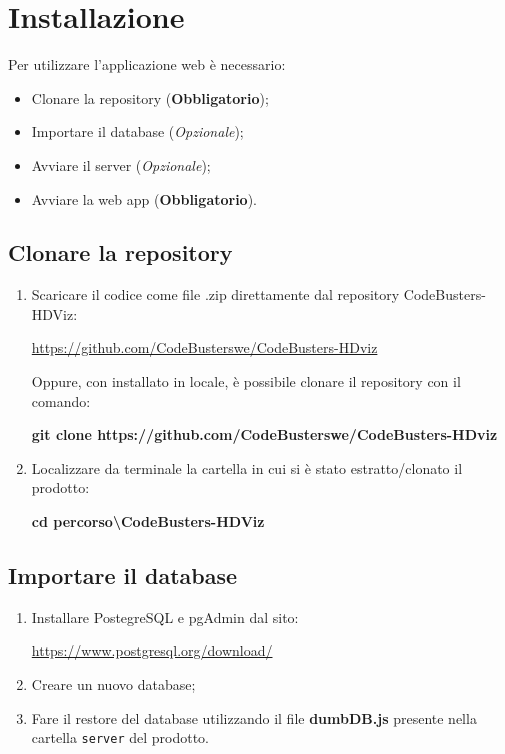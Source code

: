 \section{Installazione}
Per utilizzare l'applicazione web è necessario:
\begin{itemize}
\item Clonare la repository (\textbf{Obbligatorio});
\item Importare il database (\textit{Opzionale});
\item Avviare il server (\textit{Opzionale});
\item Avviare la web app (\textbf{Obbligatorio}).
\end{itemize}
\subsection{Clonare la repository}
\begin{enumerate}[label=\textbf{\arabic*})]
	\item Scaricare il codice come file .zip direttamente dal repository CodeBusters-HDViz:
		\begin{center}
			\textcolor{blue}{\url{https://github.com/CodeBusterswe/CodeBusters-HDviz}}
		\end{center}	
	Oppure, con  installato in locale, è possibile clonare il repository con il comando:
		\begin{center}
			\textcolor{coloreRosso}{\textbf{git clone https://github.com/CodeBusterswe/CodeBusters-HDviz}}
		\end{center}
      
	\item Localizzare da terminale la cartella in cui si è stato estratto/clonato il prodotto:  
		\begin{center}
			\textcolor{coloreRosso}{\textbf{cd percorso\textbackslash CodeBusters-HDViz}}
 		\end{center}
\end{enumerate}
\subsection{Importare il database}
\begin{enumerate}[label=\textbf{\arabic*})]
\item Installare PostegreSQL e pgAdmin dal sito:
	\begin{center}
			\textcolor{blue}{\url{https://www.postgresql.org/download/}}
	\end{center}	
\item Creare un nuovo database;
\item Fare il restore del database utilizzando il file \textbf{dumbDB.js} presente nella cartella \texttt{server} del prodotto.
\end{enumerate}
